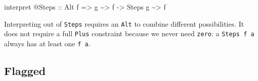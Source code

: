\documentclass[]{article}
\newenvironment{Shaded}{}{}
\newcommand{\DataTypeTok}[1]{\textcolor[rgb]{0.56,0.13,0.00}{#1}}
\newcommand{\NormalTok}[1]{#1}
\newcommand{\OperatorTok}[1]{\textcolor[rgb]{0.40,0.40,0.40}{#1}}
\newcommand{\OtherTok}[1]{\textcolor[rgb]{0.00,0.44,0.13}{#1}}
\begin{document}
\begin{itemize}
\begin{Shaded}
\begin{Highlighting}[]
\NormalTok{interpret }\OperatorTok{@}\DataTypeTok{Steps}
\OtherTok{    ::} \DataTypeTok{Alt}\NormalTok{ f}
    \OtherTok{=\textgreater{}}\NormalTok{ g }\OperatorTok{\textasciitilde{}\textgreater{}}\NormalTok{ f}
    \OtherTok{{-}\textgreater{}} \DataTypeTok{Steps}\NormalTok{ g }\OperatorTok{\textasciitilde{}\textgreater{}}\NormalTok{ f}
\end{Highlighting}
\end{Shaded}

  Interpreting out of \texttt{Steps} requires an \texttt{Alt} to combine
  different possibilities. It does not require a full \texttt{Plus} constraint
  because we never need \texttt{zero}: a \texttt{Steps\ f\ a} always has at
  least one \texttt{f\ a}.
\end{itemize}

\subsection{Flagged}\label{flagged}
\end{document}
